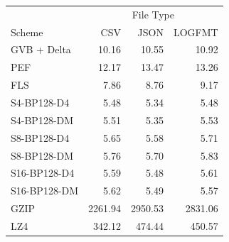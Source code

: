 \begin{tabular}{lrrr}
\toprule
 & \multicolumn{3}{c}{File Type} \\
Scheme & CSV & JSON & LOGFMT \\
\midrule
GVB + Delta & 10.16 & 10.55 & 10.92 \\
PEF & 12.17 & 13.47 & 13.26 \\
FLS & 7.86 & 8.76 & 9.17 \\
S4-BP128-D4 & 5.48 & 5.34 & 5.48 \\
S4-BP128-DM & 5.51 & 5.35 & 5.53 \\
S8-BP128-D4 & 5.65 & 5.58 & 5.71 \\
S8-BP128-DM & 5.76 & 5.70 & 5.83 \\
S16-BP128-D4 & 5.59 & 5.48 & 5.61 \\
S16-BP128-DM & 5.62 & 5.49 & 5.57 \\
GZIP & 2261.94 & 2950.53 & 2831.06 \\
LZ4 & 342.12 & 474.44 & 450.57 \\
\bottomrule
\end{tabular}
